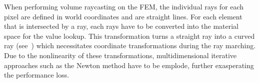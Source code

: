 \begin{figure}
\begin{subfigure}[b]{0.3\linewidth}
\end{subfigure}
\hfill
\begin{subfigure}[b]{0.3\linewidth}
\end{subfigure}
\label{contribution:medbio:fem:rays}
\end{figure}

When performing volume raycasting on the FEM, the individual rays for each pixel are defined in world coordinates and are straight lines. For each element that is intersected by a ray, each rays have to be converted into the material space for the value lookup. This transformation turns a straight ray into a curved ray (see~) which necessitates coordinate transformations during the ray marching. Due to the nonlinearity of these transformations, multidimensional iterative approaches such as the Newton method have to be emplode, further exasperating the performance loss.

